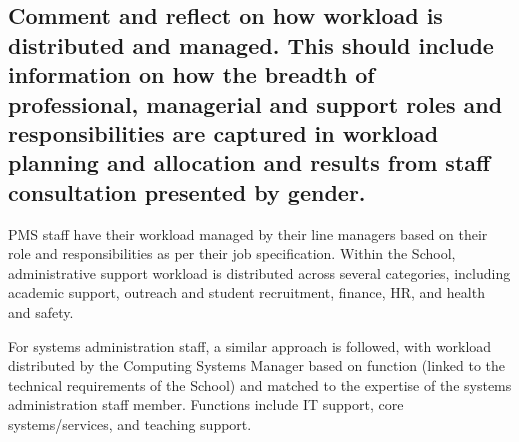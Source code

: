 \subsection{Comment and reflect on how workload is distributed and managed. This should include information on how the breadth of professional, managerial and support roles and responsibilities are captured in workload planning and allocation and results from staff consultation presented by gender.}

PMS staff have their workload managed by their line managers based on their role and responsibilities as per their job specification. Within the School, administrative support workload is distributed across %
several categories, including academic support, outreach and student recruitment, finance, HR, and health and safety.


For systems administration staff, a similar approach is followed, with workload distributed by the Computing Systems Manager based on function (linked to the technical requirements of the School) and matched to the expertise of the systems administration staff member. %
Functions include IT support, core systems/services, and teaching support.


